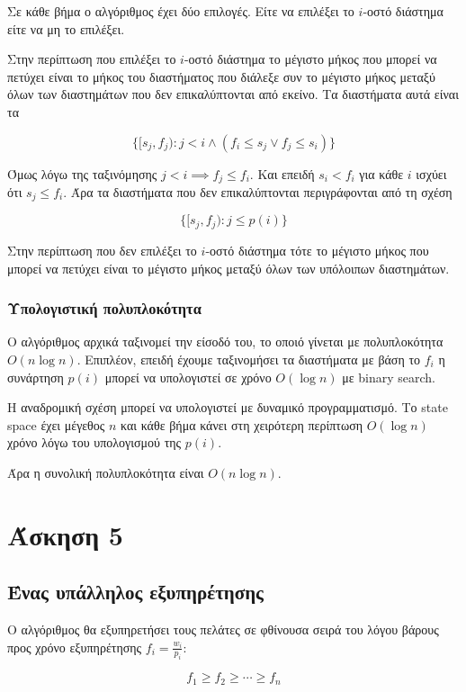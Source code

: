 Σε κάθε βήμα ο αλγόριθμος έχει δύο επιλογές. Είτε να επιλέξει το $i$-οστό
διάστημα είτε να μη το επιλέξει.

Στην περίπτωση που επιλέξει το $i$-οστό διάστημα το μέγιστο μήκος που μπορεί να
πετύχει είναι το μήκος του διαστήματος που διάλεξε συν το μέγιστο μήκος μεταξύ
όλων των διαστημάτων που δεν επικαλύπτονται από εκείνο. Τα διαστήματα αυτά
είναι τα

\[ \{ [s_{j}, f_{j}): j < i \land (f_{i} \leq s_{j} \lor f_{j} \leq s_{i})\} \]

Όμως λόγω της ταξινόμησης $j < i \implies f_{j} \leq f_{i}$. Και επειδή $s_{i}
< f_{i}$ για κάθε $i$ ισχύει ότι $s_{j} \leq f_{i}$. Άρα τα διαστήματα
που δεν επικαλύπτονται περιγράφονται από τη σχέση

\[ \{ [s_{j}, f_{j}): j \leq p(i) \} \]

Στην περίπτωση που δεν επιλέξει το $i$-οστό διάστημα τότε το μέγιστο μήκος που
μπορεί να πετύχει είναι το μέγιστο μήκος μεταξύ όλων των υπόλοιπων διαστημάτων.

\subsubsection{Υπολογιστική πολυπλοκότητα}

Ο αλγόριθμος αρχικά ταξινομεί την είσοδό του, το οποιό γίνεται με πολυπλοκότητα
$O(n\log{}n)$. Επιπλέον, επειδή έχουμε ταξινομήσει τα διαστήματα με βάση το
$f_{i}$ η συνάρτηση $p(i)$ μπορεί να υπολογιστεί σε χρόνο $O(\log{}n)$ με
binary search.

Η αναδρομική σχέση μπορεί να υπολογιστεί με δυναμικό προγραμματισμό. Το state
space έχει μέγεθος $n$ και κάθε βήμα κάνει στη χειρότερη περίπτωση $O(\log{}n)$
χρόνο λόγω του υπολογισμού της $p(i)$.

Άρα η συνολική πολυπλοκότητα είναι $O(n\log{}n)$.

\section{Άσκηση 5}

\subsection{Ένας υπάλληλος εξυπηρέτησης}

Ο αλγόριθμος θα εξυπηρετήσει τους πελάτες σε φθίνουσα σειρά του λόγου βάρους
προς χρόνο εξυπηρέτησης $f_{i} = \frac{w_{i}}{p_{i}}$:

\[ f_{1} \geq f_{2} \geq \cdots \geq f_{n} \]

